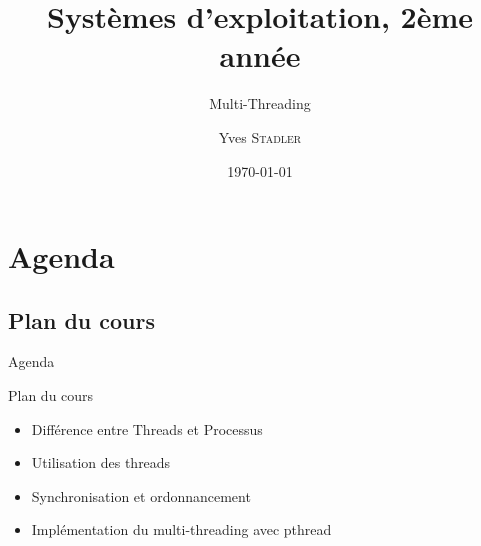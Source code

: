 
\title{Systèmes d'exploitation, 2ème année}
\subtitle{Multi-Threading}

\author{Yves \textsc{Stadler}}

\date{\today}



\begin{frame}
\titlepage
\end{frame}

\def\sectitle{Agenda}
\section{\sectitle}
\def\subsectitle{Plan du cours}
\subsection{\subsectitle}

\begin{frame}{\sectitle}
\begin{block}{\subsectitle}
\begin{itemize}
    \item Différence entre Threads et Processus
    \item Utilisation des threads
    \item Synchronisation et ordonnancement
    \item Implémentation du multi-threading avec pthread
\end{itemize}
\end{block}
\end{frame}


\def\sectitle{Différence entre Threads et Processus}
